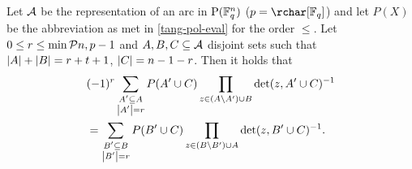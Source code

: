 \begin{lemma}\label{mds-abc-lemma}
    Let $\mathcal{A}$ be the representation of an arc in $\P(\field{q}^n)$ ($p=\rchar[\field{q}]$) and let
    $P(X)$ be the abbreviation as met in \autoref{tang-pol-eval} for the order $\leq$. Let $0\leq
    r\leq\min\set{n,p}-1$ and $A,B,C\subseteq \mathcal{A}$ disjoint sets such
    that $\left|A\right|+\left|B\right|=r+t+1$, $\left|C\right|=n-1-r$. Then it holds that
    \begin{align*}
        &(-1)^r\sum_{\substack{A'\subseteq A\\ \left|A'\right|=r}}{P(A'\cup C)\prod_{z\in (A\setminus A')\cup B}{\det(z,A'\cup C)^{-1}}}\\
        &= \sum_{\substack{B'\subseteq B\\ \left|B'\right|=r}}{P(B'\cup C)\prod_{z\in (B\setminus B')\cup A}{\det(z,B'\cup C)^{-1}}}\text{.}
    \end{align*}
\end{lemma}


